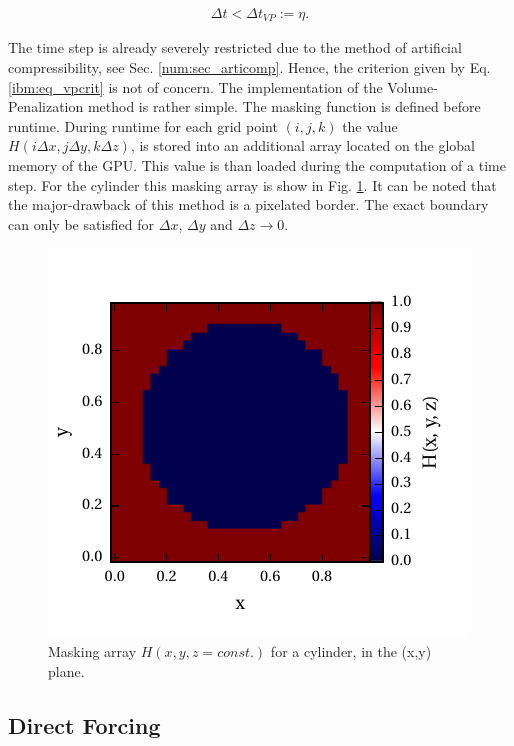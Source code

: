 \begin{align}
    \label{ibm:eq_vpcrit}
    \Delta t < \Delta t_{VP} := \eta.
\end{align}

The time step is already severely restricted due to the method of artificial compressibility, see Sec. \ref{num:sec_articomp}.
Hence, the criterion given by Eq. \ref{ibm:eq_vpcrit} is not of concern.
The implementation of the Volume-Penalization method is rather simple.
The masking function is defined before runtime.
During runtime for each grid point ${(i, j, k)}$ the value ${H(i\Delta x, j\Delta y, k \Delta z)}$,
is stored into an additional array located on the global memory of the GPU.
This value is than loaded during the computation of a time step.
For the cylinder this masking array is show in Fig. \ref{fig:ibm_maskvolpen}.
It can be noted that the major-drawback of this method is a pixelated border.
The exact boundary can only be satisfied for $\Delta x$, $\Delta y$ and $\Delta z \rightarrow 0$.

\begin{figure}[!t]
    \centering
    \includegraphics{gfx/immersed_boundary/methods/mask_volpen.pdf}
    \caption{Masking array $H(x,y,z=const.)$ for a cylinder, in the (x,y) plane.}
    \label{fig:ibm_maskvolpen}
\end{figure}

\subsection{Direct Forcing}
\label{chap:ibm_dirforce}

